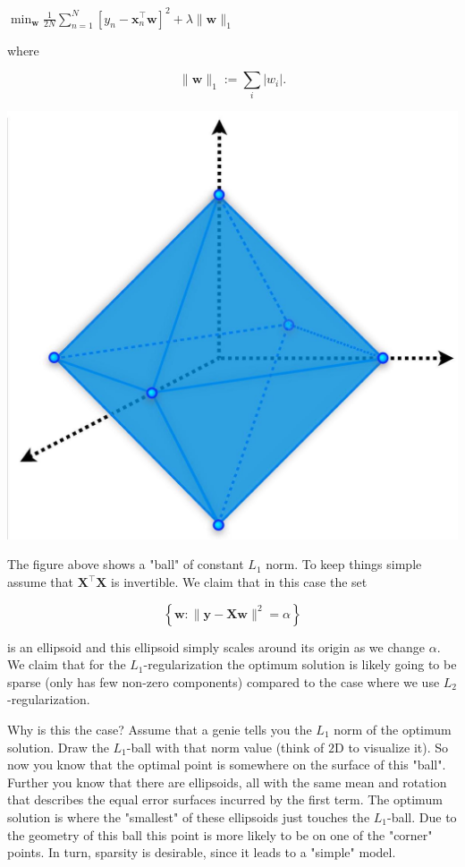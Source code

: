 \documentclass[10pt]{article}
\begin{document}
$\min _{\mathbf{w}} \frac{1}{2 N} \sum_{n=1}^{N}\left[y_{n}-\mathbf{x}_{n}^{\top} \mathbf{w}\right]^{2}+\lambda\|\mathbf{w}\|_{1}$

where

$$
\|\mathbf{w}\|_{1}:=\sum_{i}\left|w_{i}\right| .
$$

\begin{center}
\includegraphics[max width=\textwidth]{2023_12_30_0d309f6e07a388c2ea34g-05}
\end{center}

The figure above shows a "ball" of constant $L_{1}$ norm. To keep things simple assume that $\mathbf{X}^{\top} \mathbf{X}$ is invertible. We claim that in this case the set

$$
\left\{\mathbf{w}:\|\mathbf{y}-\mathbf{X} \mathbf{w}\|^{2}=\alpha\right\}
$$

is an ellipsoid and this ellipsoid simply scales around its origin as we change $\alpha$. We claim that for the $L_{1}$-regularization the optimum solution is likely going to be sparse (only has few non-zero components) compared to the case where we use $L_{2}$-regularization.

Why is this the case? Assume that a genie tells you the $L_{1}$ norm of the optimum solution. Draw the $L_{1}$-ball with that norm value (think of $2 \mathrm{D}$ to visualize it). So now you know that the optimal point is somewhere on the surface of this "ball". Further you know that there are ellipsoids, all with the same mean and rotation that describes the equal error surfaces incurred by the first term. The optimum solution is where the "smallest" of these ellipsoids just touches the $L_{1}$-ball. Due to the geometry of this ball this point is more likely to be on one of the "corner" points. In turn, sparsity is desirable, since it leads to a "simple" model.
\end{document}
